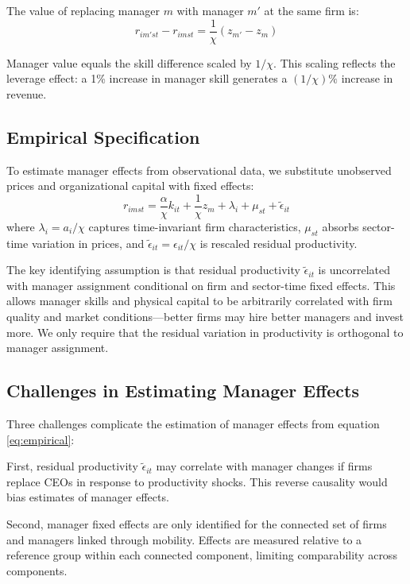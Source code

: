 \documentclass[11pt,a4paper]{article}
\begin{document}
The value of replacing manager $m$ with manager $m'$ at the same firm is:
\begin{equation}\label{eq:manager_value}
r_{im'st} - r_{imst} = \frac{1}{\chi}(z_{m'} - z_{m})
\end{equation}

Manager value equals the skill difference scaled by $1/\chi$. This scaling reflects the leverage effect: a 1\% increase in manager skill generates a $(1/\chi)\%$ increase in revenue.

\subsection{Empirical Specification}

To estimate manager effects from observational data, we substitute unobserved prices and organizational capital with fixed effects:
\begin{equation}\label{eq:empirical}
r_{imst} = \frac{\alpha}{\chi} k_{it} + \frac{1}{\chi}z_m + \lambda_i + \mu_{st} + \tilde{\epsilon}_{it}
\end{equation}
where $\lambda_i = a_i/\chi$ captures time-invariant firm characteristics, $\mu_{st}$ absorbs sector-time variation in prices, and $\tilde{\epsilon}_{it} = \epsilon_{it}/\chi$ is rescaled residual productivity.

The key identifying assumption is that residual productivity $\tilde{\epsilon}_{it}$ is uncorrelated with manager assignment conditional on firm and sector-time fixed effects. This allows manager skills and physical capital to be arbitrarily correlated with firm quality and market conditions—better firms may hire better managers and invest more. We only require that the residual variation in productivity is orthogonal to manager assignment.

\subsection{Challenges in Estimating Manager Effects}

Three challenges complicate the estimation of manager effects from equation \eqref{eq:empirical}:

First, residual productivity $\tilde{\epsilon}_{it}$ may correlate with manager changes if firms replace CEOs in response to productivity shocks. This reverse causality would bias estimates of manager effects.

Second, manager fixed effects are only identified for the connected set of firms and managers linked through mobility. Effects are measured relative to a reference group within each connected component, limiting comparability across components.
\end{document}

